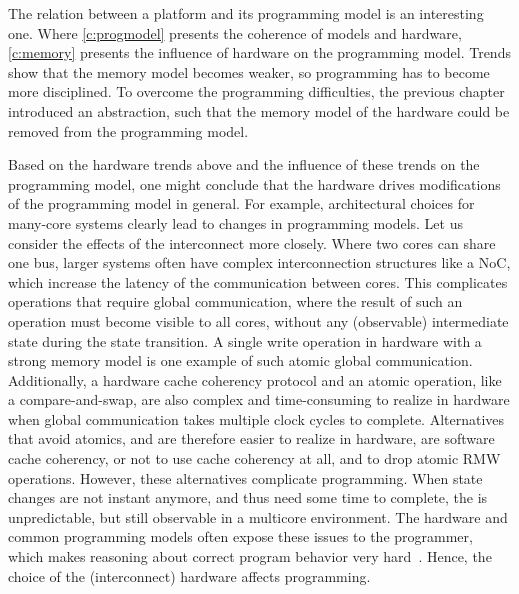 The relation between a platform and its programming model is an interesting one.
Where \cref{c:progmodel} presents the coherence of models and hardware, \cref{c:memory} presents the influence of hardware on the programming model.
Trends show that the memory model becomes weaker, so programming has to become more disciplined.
To overcome the programming difficulties, the previous chapter introduced an abstraction, such that the memory model of the hardware could be removed from the programming model.

Based on the hardware trends above and the influence of these trends on the programming model, one might conclude that the hardware drives modifications of the programming model in general.
For example, architectural choices for many-core systems clearly lead to changes in programming models.
Let us consider the effects of the interconnect more closely.
Where two cores can share one bus, larger systems often have complex interconnection structures like a \acl{NoC}, which increase the latency of the communication between cores.
This complicates operations that require  global communication, where the result of such an operation must become visible to all cores, without any (observable) intermediate state during the state transition.
A single write operation in hardware with a strong memory model is one example of such atomic global communication.
Additionally, a hardware cache coherency protocol and an atomic  operation, like a compare-and-swap, are also complex and time-consuming to realize in hardware when global communication takes multiple clock cycles to complete.
Alternatives that avoid atomics, and are therefore easier to realize in hardware, are software cache coherency, or not to use cache coherency at all, and to drop atomic \ac{RMW} operations.
However, these alternatives complicate programming.
When state changes are not instant anymore, and thus need some time to complete, the  is unpredictable, but still observable in a multicore environment.
The hardware and common programming models often expose these issues to the programmer, which makes reasoning about correct program behavior very hard~\cite{adve:rethinking}.
Hence, the choice of the (interconnect) hardware affects programming.

